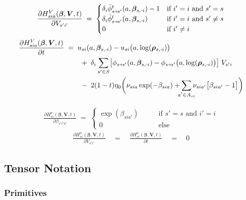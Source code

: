 \documentclass[11pt,fleqn]{article}
\newcommand{\bbeta}{\bm{\beta}}
\newcommand{\brho}{\bm{\rho}}
\newcommand{\bV}{\bm{V}}
\newcommand{\shortminus}{{\text{\scalebox{0.4}[1.0]{\(-\)}}}}
\newcommand{\minusi}{\shortminus i}
\newcommand{\shortrightarrow}{\parbox{4pt}{\tikz{\draw[->](0,0)--(4pt,0);}}}
\newcommand{\phiss}{\phi_{s\shortrightarrow s'}}
\newcommand{\barphiss}{\bar{\phi}_{s\shortrightarrow s'}}
\begin{document}
\begin{align*}
	\frac{ \partial H^V_{sia}(\bbeta,\bV,t) }{ \partial V_{s'i'} } \;=\;
		\begin{cases}
			\delta_i \barphiss^t(a,\bbeta_{s,\minusi}) - 1 &\text{if } i'=i \text{ and } s'=s \\
			\delta_i \barphiss^t(a,\bbeta_{s,\minusi}) &\text{if } i'=i \text{ and } s'\neq s \\
			0 &\text{if } i'\neq i
		\end{cases}
\end{align*}
\begin{align*}
	\frac{\partial H^V_{sia}(\bbeta,\bV,t) }{ \partial t } & \;=\; 
		u_{si}(a,\bbeta_{s,\minusi}) - u_{si}\bigl(a,\log(\brho_{s,\minusi})\bigr) \\
		& \qquad \;+\; \delta_i \sum\limits_{s'\in S} \bigl[ \phiss(a,\bbeta_{s,\minusi}) - \phiss\bigl(a,\log(\brho_{s,\minusi})\bigr) \bigr] \; V_{s'i} \\
		& \qquad \;-\; 2(1-t)\eta_0 \biggl( \nu_{sia}\exp(-\beta_{sia}) + \sum\limits_{\mathclap{a'\in A_{si}}} \nu_{sia'} \bigl[ \beta_{sia'} - 1 \bigr] \biggr)
\end{align*}

\begin{align*}
	\frac{ \partial H^\sigma_{si}(\bbeta,\bV,t) }{ \partial \beta_{s'i'a'}} \;=\; 
		\begin{cases}
			\exp(\beta_{sia'}) \qquad&\text{if } s'=s \text{ and } i'=i \\
			0 \qquad&\text{else}  
		\end{cases}
\end{align*}
\begin{align*}
	\frac{ \partial H^\sigma_{si}(\bbeta,\bV,t) }{ \partial V_{s'i'} } \quad=\quad \frac{ \partial H^\sigma_{si}(\bbeta,\bV,t) }{ \partial t } \quad=\quad 0
\end{align*}




\subsection*{Tensor Notation}


\subsubsection*{Primitives}
\end{document}
